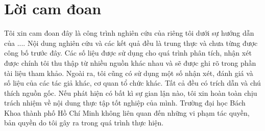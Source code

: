 \section{Lời cam đoan}
Tôi xin cam đoan đây là công trình nghiên cứu của riêng tôi dưới sự hướng
dẫn của .... Nội dung nghiên cứu và các kết quả đều là trung thực và chưa từng được công
bố trước đây. Các số liệu được sử dụng cho quá trình phân tích, nhận xét được chính tôi thu thập từ nhiều nguồn khác nhau và sẽ được ghi rõ trong phần tài liệu tham khảo.
Ngoài ra, tôi cũng có sử dụng một số nhận xét, đánh giá và số liệu của các tác giả
khác, cơ quan tổ chức khác. Tất cả đều có trích dẫn và chú thích nguồn gốc.
Nếu phát hiện có bất kì sự gian lận nào, tôi xin hoàn toàn chịu trách nhiệm về
nội dung thực tập tốt nghiệp của mình. Trường đại học Bách Khoa thành phố Hồ Chí Minh
không liên quan đến những vi phạm tác quyền, bản quyền do tôi gây ra trong quá
trình thực hiện.